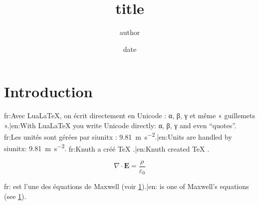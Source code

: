 \documentclass[11pt,a4paper]{article}
\title{{{title}}}
\author{{{author}}}
\date{{{date}}}
\begin{document}
\maketitle

\section{Introduction}
\label{sec:intro}

{{fr:Avec LuaLaTeX, on écrit directement en Unicode : α, β, γ et même « guillemets ».|en:With LuaLaTeX you write Unicode directly: α, β, γ and even “quotes”.}}
{{fr:Les unités sont gérées par siunitx : \qty{9.81}{\metre\per\second\squared}.|en:Units are handled by siunitx: \qty{9.81}{\metre\per\second\squared}.}}
{{fr:Knuth a créé \TeX{} \autocite{knuth1984}.|en:Knuth created \TeX{} \autocite{knuth1984}.}}

\begin{equation}
  ∇ ⋅ 𝐄 = \frac{ρ}{ε_0}
  \label{eq:gauss}
\end{equation}

{{fr: est l'une des équations de Maxwell (voir \cref{sec:intro}).|en: is one of Maxwell's equations (see \cref{sec:intro}).}}

\printbibliography
\end{document}
